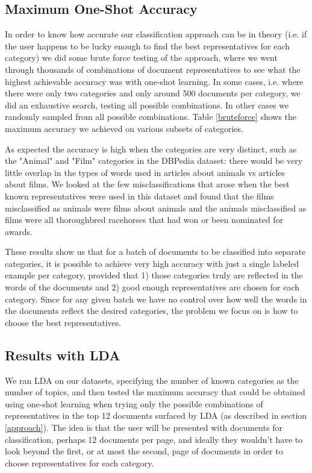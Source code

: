 \documentclass{article} %
\begin{document}
\subsection{Maximum One-Shot Accuracy}
In order to know how accurate our classification approach can be in theory (i.e. if the user happens to be lucky enough to find the best representatives for each category) we did some brute force testing of the approach, where we went through thousands of combinations of document representatives to see what the highest achievable accuracy was with one-shot learning. In some cases, i.e. where there were only two categories and only around 500 documents per category, we did an exhaustive search, testing all possible combinations. In other cases we randomly sampled from all possible combinations. Table \ref{bruteforce} shows the maximum accuracy we achieved on various subsets of categories.

As expected the accuracy is high when the categories are very distinct, such as the "Animal" and "Film" categories in the DBPedia dataset: there would be very little overlap in the types of words used in articles about animals vs articles about films. We looked at the few misclassifications that arose when the best known representatives were used in this dataset and found that the films misclassified as animals were films about animals and the animals misclassified as films were all thoroughbred racehorses that had won or been nominated for awards.

These results show us that for a batch of documents to be classified into separate categories, it is possible to achieve very high accuracy with just a single labeled example per category, provided that 1) those categories truly are reflected in the words of the documents and 2) good enough representatives are chosen for each category. Since for any given batch we have no control over how well the words in the documents reflect the desired categories, the problem we focus on is how to choose the best representatives.

\subsection{Results with LDA}
We ran LDA on our datasets, specifying the number of known categories as the number of topics, and then tested the maximum accuracy that could be obtained using one-shot learning when trying only the possible combinations of representatives in the top 12 documents surfaced by LDA (as described in section \ref{approach}). The idea is that the user will be presented with documents for classification, perhaps 12 documents per page, and ideally they wouldn't have to look beyond the first, or at most the second, page of documents in order to choose representatives for each category.
\end{document}
